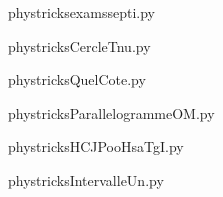     \newcommand{\CaptionFigexamssepti}{<+Type your caption here+>}
    \begin{center}
        
    \end{center}
    phystricksexamssepti.py

    

    \clearpage
    


    \newcommand{\CaptionFigCercleTnu}{<+Type your caption here+>}
    \begin{center}
        
    \end{center}
    phystricksCercleTnu.py

    

    \clearpage
    


    \newcommand{\CaptionFigQuelCote}{<+Type your caption here+>}
    \begin{center}
        
    \end{center}
    phystricksQuelCote.py

    

    \clearpage
    


    \newcommand{\CaptionFigParallelogrammeOM}{<+Type your caption here+>}
    \begin{center}
        
    \end{center}
    phystricksParallelogrammeOM.py

    

    \clearpage
    


    \newcommand{\CaptionFigHCJPooHsaTgI}{<+Type your caption here+>}
    \begin{center}
        
    \end{center}
    phystricksHCJPooHsaTgI.py

    

    \clearpage
    


    \newcommand{\CaptionFigIntervalleUn}{<+Type your caption here+>}
    \begin{center}
        
    \end{center}
    phystricksIntervalleUn.py


